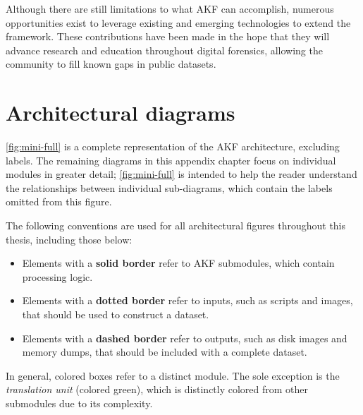 \documentclass[letterpaper,12pt]{report}
\def\tightlist{}
\begin{document}
Although there are still limitations to what AKF can accomplish,
numerous opportunities exist to leverage existing and emerging
technologies to extend the framework. These contributions have been made
in the hope that they will advance research and education throughout
digital forensics, allowing the community to fill known gaps in public
datasets.




\singlespacing
\printbibliography

\doublespacing
\appendix

\appendix

\chapter{Architectural diagrams}\label{appendix-a}

\autoref{fig:mini-full} is a complete representation of the AKF
architecture, excluding labels. The remaining diagrams in this appendix
chapter focus on individual modules in greater detail;
\autoref{fig:mini-full} is intended to help the reader understand the
relationships between individual sub-diagrams, which contain the labels
omitted from this figure.

The following conventions are used for all architectural figures
throughout this thesis, including those below:

\begin{itemize}
\tightlist
\item
  Elements with a \textbf{solid border} refer to AKF submodules, which
  contain processing logic.
\item
  Elements with a \textbf{dotted border} refer to inputs, such as
  scripts and images, that should be used to construct a dataset.
\item
  Elements with a \textbf{dashed border} refer to outputs, such as disk
  images and memory dumps, that should be included with a complete
  dataset.
\end{itemize}

In general, colored boxes refer to a distinct module. The sole exception
is the \emph{translation unit} (colored green), which is distinctly
colored from other submodules due to its complexity.
\end{document}
